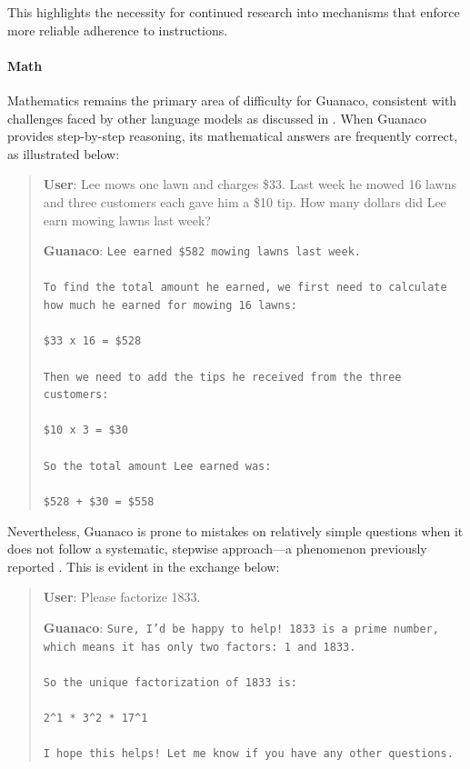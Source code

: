 This highlights the necessity for continued research into mechanisms that enforce more reliable adherence to instructions.

\paragraph{Math} Mathematics remains the primary area of difficulty for {Guanaco}, consistent with challenges faced by other language models as discussed in \citep{liang2022holistic}. When {Guanaco} provides step-by-step reasoning, its mathematical answers are frequently correct, as illustrated below:

\begin{quote}
    \textbf{User}: Lee mows one lawn and charges \$33. Last week he mowed 16 lawns and three customers each gave him a \$10 tip. How many dollars did Lee earn mowing lawns last week?

    \textbf{Guanaco}: \texttt{Lee earned \$582 mowing lawns last week. \\ \\ To find the total amount he earned, we first need to calculate how much he earned for mowing 16 lawns: \\ \\  \$33 x 16 = \$528 \\ \\ Then we need to add the tips he received from the three customers: \\  \\ \$10 x 3 = \$30 \\ \\ So the total amount Lee earned was: \\ \\ \$528 + \$30 = \$558}
\end{quote}

Nevertheless, {Guanaco} is prone to mistakes on relatively simple questions when it does not follow a systematic, stepwise approach—a phenomenon previously reported \cite{weichain}. This is evident in the exchange below:

\begin{quote}
    \textbf{User}: Please factorize 1833.

    \textbf{Guanaco}: \texttt{Sure, I'd be happy to help! 1833 is a prime number, which means it has only two factors: 1 and 1833. \\ \\ So the unique factorization of 1833 is: \\ \\ 2\^{}1 * 3\^{}2 * 17\^{}1 \\ \\ I hope this helps! Let me know if you have any other questions.}
\end{quote}

